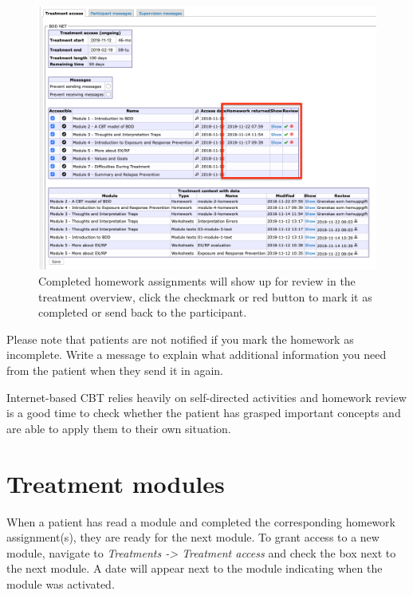 \documentclass[]{book}
\theoremstyle{definition}
\theoremstyle{definition}
\theoremstyle{definition}
\theoremstyle{remark}
\begin{document}
\begin{figure}
\centering
\includegraphics{images/homework-complete.png}
\caption{Completed homework assignments will show up for review in the
treatment overview, click the checkmark or red button to mark it as
completed or send back to the participant.}
\end{figure}

Please note that patients are not notified if you mark the homework as
incomplete. Write a message to explain what additional information you
need from the patient when they send it in again.

Internet-based CBT relies heavily on self-directed activities and
homework review is a good time to check whether the patient has grasped
important concepts and are able to apply them to their own situation.

\hypertarget{treatment-modules}{%
\section{Treatment modules}\label{treatment-modules}}

When a patient has read a module and completed the corresponding
homework assignment(s), they are ready for the next module. To grant
access to a new module, navigate to \emph{Treatments -\textgreater{}
Treatment access} and check the box next to the next module. A date will
appear next to the module indicating when the module was activated.
\end{document}
